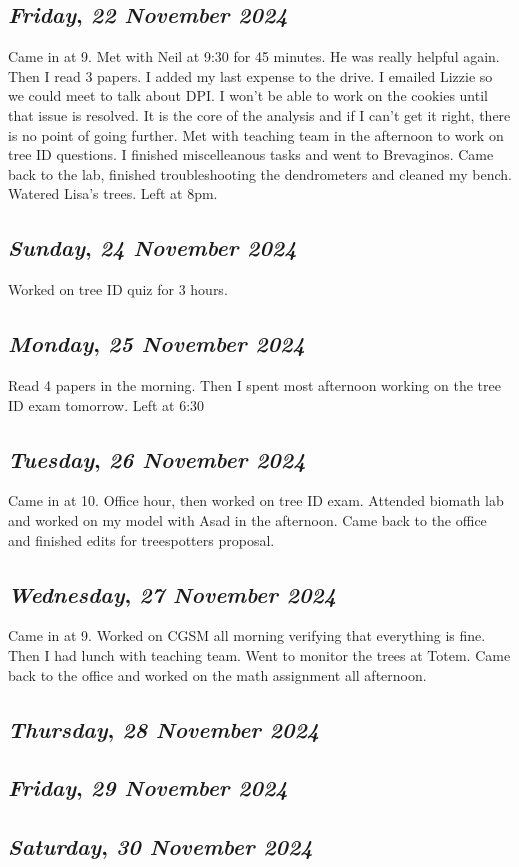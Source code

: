 \def\day{\textit{22 November 2024}}
\def\weekday{\textit{Friday}}
\subsection*{\weekday, \day}
Came in at 9. Met with Neil at 9:30 for 45 minutes. He was really helpful again. Then I read 3 papers. I added my last expense to the drive. I emailed Lizzie so we could meet to talk about DPI. I won't be able to work on the cookies until that issue is resolved. It is the core of the analysis and if I can't get it right, there is no point of going further. Met with teaching team in the afternoon to work on tree ID questions. I finished miscelleanous tasks and went to Brevaginos. Came back to the lab, finished troubleshooting the dendrometers and cleaned my bench. Watered Lisa's trees. Left at 8pm. 

\def\day{\textit{24 November 2024}}
\def\weekday{\textit{Sunday}}
\subsection*{\weekday, \day}
Worked on tree ID quiz for 3 hours. 

\def\day{\textit{25 November 2024}}
\def\weekday{\textit{Monday}}
\subsection*{\weekday, \day}
Read 4 papers in the morning. Then I spent most afternoon working on the tree ID exam tomorrow. Left at 6:30

\def\day{\textit{26 November 2024}}
\def\weekday{\textit{Tuesday}}
\subsection*{\weekday, \day}
Came in at 10. Office hour, then worked on tree ID exam. Attended biomath lab and worked on my model with Asad in the afternoon. Came back to the office and finished edits for treespotters proposal.

\def\day{\textit{27 November 2024}}
\def\weekday{\textit{Wednesday}}
\subsection*{\weekday, \day}
Came in at 9. Worked on CGSM all morning verifying that everything is fine. Then I had lunch with teaching team. Went to monitor the trees at Totem. Came back to the office and worked on the math assignment all afternoon.
\def\day{\textit{28 November 2024}}
\def\weekday{\textit{Thursday}}
\subsection*{\weekday, \day}

\def\day{\textit{29 November 2024}}
\def\weekday{\textit{Friday}}
\subsection*{\weekday, \day}

\def\day{\textit{30 November 2024}}
\def\weekday{\textit{Saturday}}
\subsection*{\weekday, \day}
